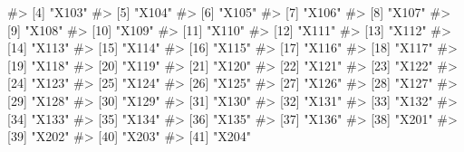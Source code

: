 \documentclass[
  letterpaper,
]{krantz}
\makeatletter
\newenvironment{Shaded}{\begin{snugshade}}{\end{snugshade}}
\newcommand{\CommentTok}[1]{\textcolor[rgb]{0.37,0.37,0.37}{#1}}
\newenvironment{kframe}{%
\medskip{}
\setlength{\fboxsep}{.8em}
 \def\at@end@of@kframe{}%
 \ifinner\ifhmode%
  \def\at@end@of@kframe{\end{minipage}}%
  \begin{minipage}{\columnwidth}%
 \fi\fi%
 \def\FrameCommand##1{\hskip\@totalleftmargin \hskip-\fboxsep
 \colorbox{shadecolor}{##1}\hskip-\fboxsep
     \hskip-\linewidth \hskip-\@totalleftmargin \hskip\columnwidth}%
 \MakeFramed {\advance\hsize-\width
   \@totalleftmargin\z@ \linewidth\hsize
   \@setminipage}}%
 {\par\unskip\endMakeFramed%
 \at@end@of@kframe}
\renewenvironment{Shaded}{\begin{kframe}}{\end{kframe}}
\makeatother
\begin{document}
\begin{Shaded}
\begin{Highlighting}[]
\CommentTok{\#\textgreater{}  [4] "X103"                            }
\CommentTok{\#\textgreater{}  [5] "X104"                            }
\CommentTok{\#\textgreater{}  [6] "X105"                            }
\CommentTok{\#\textgreater{}  [7] "X106"                            }
\CommentTok{\#\textgreater{}  [8] "X107"                            }
\CommentTok{\#\textgreater{}  [9] "X108"                            }
\CommentTok{\#\textgreater{} [10] "X109"                            }
\CommentTok{\#\textgreater{} [11] "X110"                            }
\CommentTok{\#\textgreater{} [12] "X111"                            }
\CommentTok{\#\textgreater{} [13] "X112"                            }
\CommentTok{\#\textgreater{} [14] "X113"                            }
\CommentTok{\#\textgreater{} [15] "X114"                            }
\CommentTok{\#\textgreater{} [16] "X115"                            }
\CommentTok{\#\textgreater{} [17] "X116"                            }
\CommentTok{\#\textgreater{} [18] "X117"                            }
\CommentTok{\#\textgreater{} [19] "X118"                            }
\CommentTok{\#\textgreater{} [20] "X119"                            }
\CommentTok{\#\textgreater{} [21] "X120"                            }
\CommentTok{\#\textgreater{} [22] "X121"                            }
\CommentTok{\#\textgreater{} [23] "X122"                            }
\CommentTok{\#\textgreater{} [24] "X123"                            }
\CommentTok{\#\textgreater{} [25] "X124"                            }
\CommentTok{\#\textgreater{} [26] "X125"                            }
\CommentTok{\#\textgreater{} [27] "X126"                            }
\CommentTok{\#\textgreater{} [28] "X127"                            }
\CommentTok{\#\textgreater{} [29] "X128"                            }
\CommentTok{\#\textgreater{} [30] "X129"                            }
\CommentTok{\#\textgreater{} [31] "X130"                            }
\CommentTok{\#\textgreater{} [32] "X131"                            }
\CommentTok{\#\textgreater{} [33] "X132"                            }
\CommentTok{\#\textgreater{} [34] "X133"                            }
\CommentTok{\#\textgreater{} [35] "X134"                            }
\CommentTok{\#\textgreater{} [36] "X135"                            }
\CommentTok{\#\textgreater{} [37] "X136"                            }
\CommentTok{\#\textgreater{} [38] "X201"                            }
\CommentTok{\#\textgreater{} [39] "X202"                            }
\CommentTok{\#\textgreater{} [40] "X203"                            }
\CommentTok{\#\textgreater{} [41] "X204"                            }

\end{Highlighting}
\end{Shaded}
\end{document}
